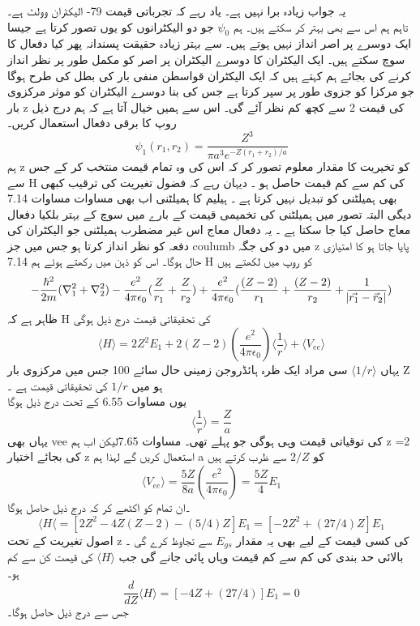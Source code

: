 \documentclass{book}
\begin{document}
یہ جواب زیادہ برا نہیں ہے۔
یاد رہے کہ تجرباتی قیمت 79- الیکٹران وولٹ ہے۔\\
تاہم ہم اس سے بھی بہتر کر سکتے ہیں۔
ہم
\(\psi_{0}\)
جو دو الیکٹرانوں کو یوں تصور کرتا ہے جیسا ایک دوسرے پر اصر انداز نہیں ہوتے ہیں۔
سے بہتر زیادہ حقیقت پسندانہ پھر کیا دفعال کا سوچ سکتے ہیں۔
ایک الیکٹران کا دوسرے الیکٹران پر اصر کو مکمل طور پر نظر انداز کرنے کی بجائے ہم کہتے ہیں کہ ایک الیکٹران قواسطن منفی بار کی بطل کی طرح ہوگا جو مرکزا کو جزوی طور پر سپر کرتا ہے جس کی بنا دوسرے الیکٹران کو موثر مرکزوی بار z کی قیمت 2 سے کچھ کم نظر آئے گی۔ اس سے ہمیں خیال آتا ہے کہ ہم درج ذیل روپ کا برقی دفعال استعمال کریں۔
\[\psi_{1}(r_{1},r_{2})=\frac{Z^{3}}{\pi a^{3}e^{-Z(r_{1}+r_{2})/a}}\]
ہم z کو تخیریت کا مقدار معلوم تصور کر کہ اس کی وہ تمام قیمت منتخب کر کے جس سے H کی کم سے کم قیمت حاصل ہو ۔
دیہان رہے کہ فضول تغیریت کی ترقیب کبھی بھی ہمیلٹنی کو تبدیل نہیں کرتا ہے ۔
ہیلیم کا ہمیلٹنی اب بھی مساوات 
مساوات 7.14
دیگی البتہ
تصور میں ہمیلٹنی کی تخمیمی قیمت کے بارے میں سوچ کے بہتر بلکیا دفعال معاج حاصل کیا جا سکتا ہے ۔
یہ دفعال معاج اس غیر مضطرب ہمیلٹنی جو الیکٹران کی دفعہ کو نظر انداز کرتا ہو جس میں جز coulumb میں دو کی جگہ z پایا جاتا ہو کا امتیازی حال ہوگا۔
اس کو ذہن میں رکھتے ہوئے ہم 7.14 H کو روپ میں لکھتے ہیں 
\[-\frac{\hbar^{2}}{2m}(\nabla_{1}^{2}+\nabla_{2}^{2})-\frac{e^{2}}{4\pi\epsilon_{0}}(\frac{Z}{r_{1}}+\frac{Z}{r_{2}})+\frac{e^{2}}{4\pi\epsilon_{0}}(\frac{(Z-2)}{r_{1}}+\frac{(Z-2)}{r_{2}}+\frac{1}{\abs{\vec{r_{1}}-\vec{r}_{2}}})\]
ظاہر ہے کہ H کی تحقیقاتی قیمت درج ذیل ہوگی 
\[\langle H \rangle = 2Z^{2}E_{1}+2(Z-2)(\frac{e^{2}}{4\pi\epsilon_{0}})\langle \frac{1}{r}\rangle + \langle V_{ee} \rangle \]
یہاں
\(\langle 1/r \rangle \) 
سی مراد ایک ظرہ ہائڈروجن زمینی حال سائے 100 جس میں مرکزوی بار 
Z
 ہو میں
\(1/r\)
کی تحقیقاتی قیمت ہے ۔\\
یوں مساوات 6.55 کے تحت درج ذیل ہوگا 
\[\langle \frac{1}{r} \rangle = \frac{Z}{a}\]
یہاں بھی vee کی توقیاتی قیمت وہی ہوگی جو پہلے تھی۔
مساوات 7.65لیکن اب ہم z =2 کی بجائے اختیار z استعمال کریں گے لہذا ہم a کو 
\(2/Z\)
 سے ظرب کرتے ہیں 
 \[\langle V_{ee} \rangle =\frac{5Z}{8a}(\frac{e^{2}}{4\pi\epsilon_{0}})=\frac{5Z}{4}E_{1}\]
 ۔ان تمام کو اکٹھے کر کہ درج ذیل حاصل ہوگا 
 \[\langle H \langle =[2Z^{2}-4Z(Z-2)-(5/4)Z]E_{1}=[-2Z^{2}+(27/4)Z]E_{1}\]
اصول تغیریت کے تحت z کی کسی قیمت کے لیے بھی یہ مقدار 
\(E_{gs}\)
سے تجاوظ کرے گی ۔\\
بالائی حد بندی کی کم سے کم قیمت وہاں پائی جانے گی جب
 \(\langle H \rangle  \)
  کی قیمت کن سے کم ہو۔\\
\[\frac{d}{dZ}\langle H \rangle =[-4Z+(27/4)]E_{1}=0\]
جس سے درج ذیل حاصل ہوگا۔
\end{document}
